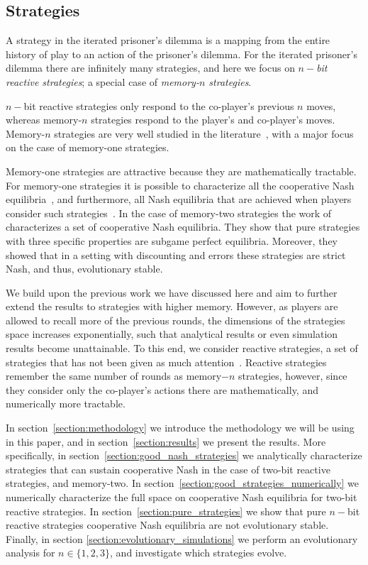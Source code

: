 \documentclass{article}
\theoremstyle{definition}
\begin{document}
\subsection{Strategies}

A strategy in the iterated prisoner's dilemma is a mapping from the entire history of
play to an action of the prisoner's dilemma. For the iterated prisoner's dilemma
there are infinitely many strategies, and here we focus on \textit{\(n-\)bit
reactive strategies}; a special case of \textit{memory-\(n\) strategies}.

\(n-\)bit reactive strategies only respond to the co-player's previous \(n\)
moves, whereas memory-\(n\) strategies respond to the player's and co-player's
moves. Memory-\(n\) strategies are very well studied in the
literature~\citep{baek:scientific:2016, hilbe:PNAS:2017,
glynatsi:scientific:2020, press:PNAS:2012, stewart:scientific:2016}, with a major
focus on the case of memory-one strategies.

Memory-one strategies are attractive because they are mathematically tractable.
For memory-one strategies it is possible to characterize all the cooperative
Nash equilibria~\citep{akin:EGADS:2016}, and furthermore, all Nash equilibria
that are achieved when players consider such
strategies~\citep{stewart:scientific:2016}. In the case of memory-two strategies
the work of~\citep{hilbe:PNAS:2017} characterizes a set of cooperative Nash equilibria.
They show that pure strategies with three specific properties are
subgame perfect equilibria. Moreover, they showed that in a setting with discounting
and errors these strategies are strict Nash, and thus, evolutionary stable.

We build upon the previous work we have discussed here and aim to further extend
the results to strategies with higher memory. However, as players are allowed to
recall more of the previous rounds, the dimensions of the strategies space
increases exponentially, such that analytical results or even simulation results
become unattainable. To this end, we consider reactive strategies,
a set of strategies that has not been given as much attention~\citep{baek:scientific:2016, sigmund:JTB:1989, wahl:JTB:1999}.
Reactive strategies remember
the same number of rounds as memory\(-n\) strategies, however, since they consider
only the co-player's actions there are mathematically, and numerically more
tractable.

In section~\ref{section:methodology} we introduce the methodology we will be
using in this paper, and in section~\ref{section:results} we present the
results. More specifically, in section~\ref{section:good_nash_strategies} we
analytically characterize strategies that can sustain cooperative Nash in the
case of two-bit reactive strategies, and memory-two. In
section~\ref{section:good_strategies_numerically} we numerically characterize
the full space on cooperative Nash equilibria for two-bit reactive strategies.
In section~\ref{section:pure_strategies} we show that pure \(n-\)bit reactive
strategies cooperative Nash equilibria are not evolutionary stable. Finally, in section
\ref{section:evolutionary_simulations} we perform an evolutionary analysis for
\(n \in \{1, 2, 3\}\), and investigate which strategies evolve.
\end{document}
